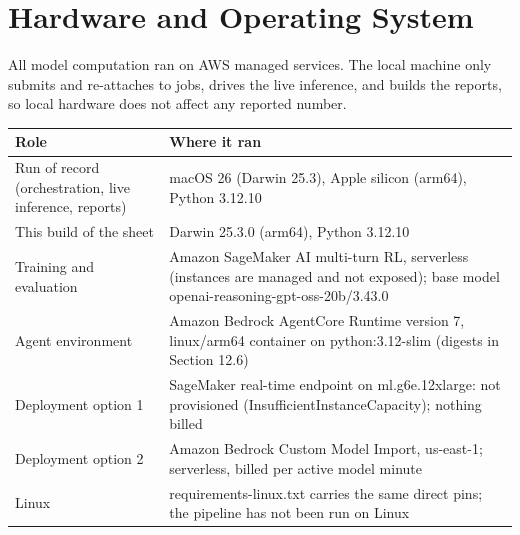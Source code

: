 \documentclass[11pt]{article}
\begin{document}
\section{Hardware and Operating System}
All model computation ran on AWS managed services. The local machine only submits and re-attaches to jobs,
drives the live inference, and builds the reports, so local hardware does not affect any reported number.
\begin{center}
\begin{minipage}{\linewidth}\centering
\begin{tabular}{P{4.6cm}P{10.8cm}}
\toprule
\textbf{Role} & \textbf{Where it ran} \\
\midrule
Run of record (orchestration, live inference, reports) & macOS 26 (Darwin 25.3), Apple silicon (arm64), Python 3.12.10 \\
This build of the sheet & Darwin 25.3.0 (arm64), Python 3.12.10 \\
Training and evaluation & Amazon SageMaker AI multi-turn RL, serverless (instances are managed and not exposed); base model openai-reasoning-gpt-oss-20b/3.43.0 \\
Agent environment & Amazon Bedrock AgentCore Runtime version 7, linux/arm64 container on python:3.12-slim (digests in Section 12.6) \\
Deployment option 1 & SageMaker real-time endpoint on ml.g6e.12xlarge: not provisioned (InsufficientInstanceCapacity); nothing billed \\
Deployment option 2 & Amazon Bedrock Custom Model Import, us-east-1; serverless, billed per active model minute \\
Linux & requirements-linux.txt carries the same direct pins; the pipeline has not been run on Linux \\
\bottomrule
\end{tabular}
\end{minipage}
\end{center}
\end{document}
